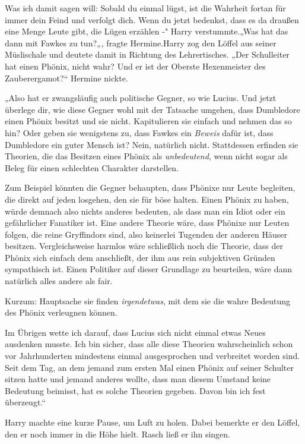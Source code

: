 {Was ich damit sagen will: Sobald du einmal lügst, ist die Wahrheit fortan für immer dein Feind und verfolgt dich. Wenn du jetzt bedenkst, dass es da draußen eine Menge Leute gibt, die Lügen erzählen -" Harry verstummte.„Was hat das dann mit Fawkes zu tun?„, fragte Hermine.Harry zog den Löffel aus seiner Müslischale und deutete damit in Richtung des Lehrertisches. „Der Schulleiter hat einen Phönix, nicht wahr? Und er ist der Oberste Hexenmeister des Zauberergamot?“ Hermine nickte.

„Also hat er zwangsläufig auch politische Gegner, so wie Lucius. Und jetzt überlege dir, wie diese Gegner wohl mit der Tatsache umgehen, dass Dumbledore einen Phönix besitzt und sie nicht. Kapitulieren sie einfach und nehmen das so hin? Oder geben sie wenigstens zu, dass Fawkes ein \emph{Beweis} dafür ist, dass Dumbledore ein guter Mensch ist? Nein, natürlich nicht. Stattdessen erfinden sie Theorien, die das Besitzen eines Phönix als \emph{unbedeutend}, wenn nicht sogar als Beleg für einen schlechten Charakter darstellen.

Zum Beispiel könnten die Gegner behaupten, dass Phönixe nur Leute begleiten, die direkt auf jeden losgehen, den sie für böse halten. Einen Phönix zu haben, würde demnach also nichts anderes bedeuten, als dass man ein Idiot oder ein gefährlicher Fanatiker ist. Eine andere Theorie wäre, dass Phönixe nur Leuten folgen, die reine Gryffindors sind, also keinerlei Tugenden der anderen Häuser besitzen. Vergleichsweise harmlos wäre schließlich noch die Theorie, dass der Phönix sich einfach dem anschließt, der ihm aus rein subjektiven Gründen sympathisch ist. Einen Politiker auf dieser Grundlage zu beurteilen, wäre dann natürlich alles andere als fair.

Kurzum: Hauptsache sie finden \emph{irgendetwas}, mit dem sie die wahre Bedeutung des Phönix verleugnen können.

Im Übrigen wette ich darauf, dass Lucius sich nicht einmal etwas Neues ausdenken musste. Ich bin sicher, dass alle diese Theorien wahrscheinlich schon vor Jahrhunderten mindestens einmal ausgesprochen und verbreitet worden sind. Seit dem Tag, an dem jemand zum ersten Mal einen Phönix auf seiner Schulter sitzen hatte und jemand anderes wollte, dass man diesem Umstand keine Bedeutung beimisst, hat es solche Theorien gegeben. Davon bin ich fest überzeugt.“

Harry machte eine kurze Pause, um Luft zu holen. Dabei bemerkte er den Löffel, den er noch immer in die Höhe hielt. Rasch ließ er ihn singen.

}
